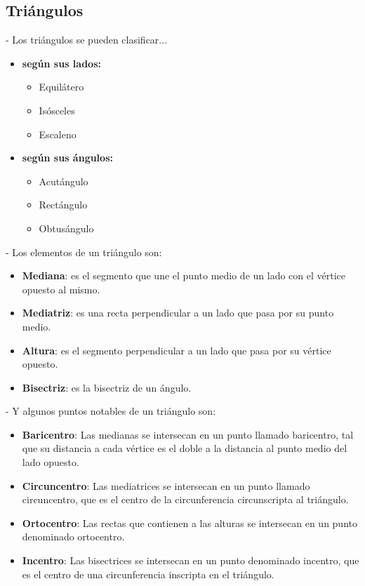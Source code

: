 \documentclass[10pt]{article}
\begin{document}
\subsection{Triángulos}
- Los triángulos se pueden clasificar...
\begin{multicols}{2}
\begin{itemize}
\item \textbf{según sus lados:}
\begin{itemize}
\item Equilátero
\item Isósceles
\item Escaleno
\end{itemize}
\item \textbf{según sus ángulos:}
\begin{itemize}
\item Acutángulo
\item Rectángulo
\item Obtusángulo
\end{itemize}
\end{itemize}
\end{multicols}
\vspace{.5cm}
- Los elementos de un triángulo son:
\begin{itemize}
\item \textbf{Mediana}: es el segmento que une el punto medio de un lado con el vértice opuesto al mismo.
\item \textbf{Mediatriz}: es una recta perpendicular a un lado que pasa por su punto medio.
\item \textbf{Altura}: es el segmento perpendicular a un lado que pasa por su vértice opuesto.
\item \textbf{Bisectriz}: es la bisectriz de un ángulo.
\end{itemize}
\vspace{1cm}
- Y algunos puntos notables de un triángulo son:
\begin{itemize}
\item \textbf{Baricentro}: Las medianas se intersecan en un punto llamado baricentro, tal que su distancia a cada vértice es el doble a la distancia al punto medio del lado opuesto.
\item \textbf{Circuncentro}: Las mediatrices se intersecan en un punto llamado circuncentro, que es el centro de la circunferencia circunscripta al triángulo.
\item \textbf{Ortocentro}: Las rectas que contienen a las alturas se intersecan en un punto denominado ortocentro.
\item \textbf{Incentro}: Las bisectrices se intersecan en un punto denominado incentro, que es el centro de una circunferencia inscripta en el triángulo.
\end{itemize}
\end{document}
